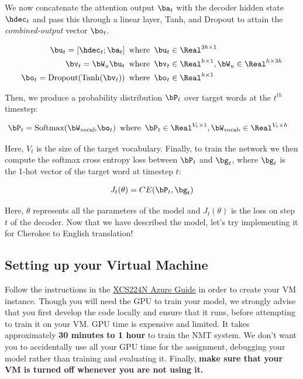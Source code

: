 We now concatenate the attention output $\ba_t$ with the decoder hidden state $\hdec_t$ and pass this through a linear layer, Tanh, and Dropout to attain the \textit{combined-output} vector $\bo_{t}$.

\begin{align}   
    \bu_{t} = [\hdec_t; \ba_{t}] \enspace &\text{where} \enspace \bu_t \in \Real^{3h \times 1} \\
    \bv_t = \bW_{u}\bu_t \enspace &\text{where} \enspace \bv_t \in \Real^{h \times 1}, \bW_{u} \in \Real^{h \times 3h}\\
    \bo_t = \text{Dropout}(\text{Tanh}(\bv_t)) \enspace &\text{where} \enspace \bo_t \in \Real^{h \times 1}
\end{align}

Then, we produce a probability distribution $\bP_t$ over target words at the $t^{th}$ timestep:

\begin{align}
    \bP_t = \text{Softmax}(\bW_{\text{vocab}}\bo_{t}) \enspace &\text{where} \enspace \bP_t \in \Real^{V_{t} \times 1}, \bW_{\text{vocab}} \in \Real^{V_{t} \times h}
\end{align}

Here, $V_{t}$ is the size of the target vocabulary. Finally, to train the network we then compute the softmax cross entropy loss between $\bP_t$ and $\bg_{t}$, where $\bg_{t}$ is the 1-hot vector of the target word at timestep $t$:

\begin{align}
    J_t(\theta) = CE(\bP_t,\bg_{t})
\end{align}

Here, $\theta$ represents all the parameters of the model and $J_t(\theta)$ is the loss on step $t$ of the decoder.
Now that we have described the model, let's try implementing it for Cherokee to English translation!

\subsection*{{\color{red} Setting up your Virtual Machine}}
Follow the instructions in the \href{https://docs.google.com/document/d/10J520Vnb1LnAMo0qgSYpG5cEEbomqQ371NIqg1IAv-4/edit?usp=sharing}{XCS224N Azure Guide} in order to create your VM instance. Though you will need the GPU to train your model, we strongly advise that you first develop the code locally and ensure that it runs, before attempting to train it on your VM. GPU time is expensive and limited. It takes approximately \textbf{30 minutes to 1 hour} to train the NMT system. We don't want you to accidentally use all your GPU time for the assignment, debugging your model rather than training and evaluating it. Finally, \textbf{make sure that your VM is turned off whenever you are not using it.}

